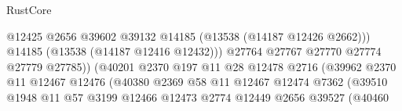 \begin{lexlean}{RustCore}
\begin{coremodule}
                                                      @12425
                                                      @2656
                                                      @39602
                                                      @39132
                                                      @14185
                                                      (@13538 (@14187 @12426 @2662)))
                                                    @14185
                                                    (@13538 (@14187 @12416 @12432)))
                                                  @27764
                                                  @27767
                                                  @27770
                                                  @27774
                                                  @27779
                                                  @27785))
                                              (@40201
                                                @2370
                                                @197
                                                @11
                                                @28
                                                @12478
                                                @2716
                                                (@39962
                                                  @2370
                                                  @11
                                                  @12467
                                                  @12476
                                                  (@40380
                                                    @2369
                                                    @58
                                                    @11
                                                    @12467
                                                    @12474
                                                    @7362
                                                    (@39510
                                                      @1948
                                                      @11
                                                      @57
                                                      @3199
                                                      @12466
                                                      @12473
                                                      @2774
                                                      @12449
                                                      @2656
                                                      @39527
                                                      (@40460

\end{coremodule}
\end{lexlean}
